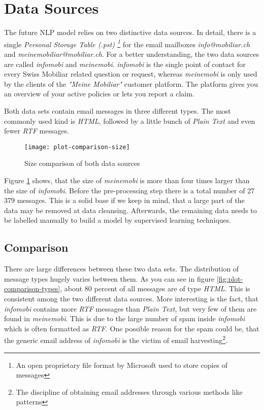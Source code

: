 \section{Data Sources}

The future NLP model relies on two distinctive data sources. In detail, there is a single \emph{Personal Storage Table (.pst)
\footnote{An open proprietary file format by Microsoft used to store copies of messages}} for the email mailboxes
\emph{info@mobiliar.ch} and \emph{meinemobiliar@mobiliar.ch}. For a better understanding, the two data sources are called
\emph{\gls{infomobi}} and \emph{\gls{meinemobi}}. \emph{infomobi} is the single point of contact for every Swiss Mobiliar
related question or request, whereas \emph{meinemobi} is only used by the clients of the \emph{"Meine Mobiliar"} customer platform.
The platform gives you an overview of your active policies or lets you report a claim.

Both data sets contain email messages in three different types. The most commonly used kind is \emph{HTML}, followed by
a little bunch of \emph{Plain Text} and even fewer \emph{RTF} messages.

\begin{figure}[!ht]
    \centering
    \texttt{[image: plot-comparison-size]}
    \caption{Size comparison of both data sources}
    \label{fig:plot-comparison-size}
\end{figure}

Figure \ref{fig:plot-comparison-size} shows, that the size of \emph{meinemobi} is more than four times larger than the size
of \emph{infomobi}. Before the pre-processing step there is a total number of 27 379 messages. This is a solid base if we
keep in mind, that a large part of the data may be removed at data cleansing. Afterwards, the remaining data needs to be
labelled manually to build a model by supervised learning techniques.

\subsection{Comparison}

There are large differences between these two data sets. The distribution of message types hugely varies between them.
As you can see in figure \ref{fig:plot-comparison-types}, about 80 percent of all messages are of type \emph{HTML}.
This is consistent among the two different data sources. More interesting is the fact, that \emph{infomobi} contains
more \emph{RTF} messages than \emph{Plain Text}, but very few of them are found in \emph{meinemobi}. This is due to
the large number of spam inside \emph{infomobi} which is often formatted as \emph{RTF}. One possible reason for the spam could be,
that the generic email address of \emph{infomobi} is the victim of email harvesting\footnote{The discipline of obtaining email
addresses through various methods like patterns}.

